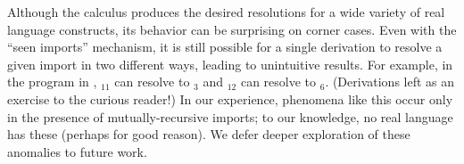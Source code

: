 Although the calculus produces the desired resolutions for a wide variety
of real language constructs, its behavior can be surprising on corner cases.
Even with the ``seen imports'' mechanism, it is still possible for
a single derivation to resolve a given import in two different ways, leading to 
unintuitive results.  For example, in the program in ,
$_{11}$ can resolve to $_3$ and
$_{12}$ can resolve to $_6$. (Derivations left as an exercise
to the curious reader!)  
In our experience, phenomena like this occur only in the presence of
mutually-recursive imports; to our knowledge, no real language has these
(perhaps for good reason).  We defer deeper exploration of these anomalies
to future work.


\endinput
	  
\paragraph{Cyclic Import Dependencies}

\begin{lstlisting}
module A { import B }
module B { import A }
\end{lstlisting}

\begin{lstlisting}
module A {
   module B {}
}
module B {
   module A {}
}
module M {
   import C;
   import D;   
   module C { import A };
   module D { import B }
} 
\end{lstlisting}

The resolution of {\tt A} can use {\tt import B} through {\tt import D} and the resolution of {\tt B} can use {\tt import A} through {\tt import C}.
Thus with seen imports both imports resolve to the innermost modules.
The following program also has the same behavior:

\begin{lstlisting}
module A {
   module B {}
}
module B {
   module A {}
}
module M {
   import C.D; 
   module C {     
      import A 
      module D { 
         import B }
      }
   }
} 
\end{lstlisting}




\paragraph{}


Notice that the identifier of an import can have a different enclosing scope than the
scope for which it is an import. 

